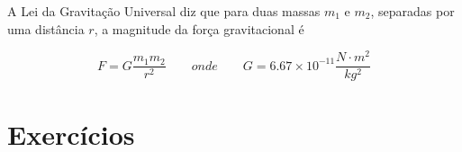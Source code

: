 A Lei da Gravitação Universal diz que para duas massas $m_1$ e $m_2$, separadas por uma distância $r$, a magnitude da força gravitacional é

\begin{equation}
    F=G\frac{m_1m_2}{r^2} \qquad onde \qquad G=6.67\times 10^{-11}\frac{N\cdot m^2}{kg^2}
\end{equation}

\section{Exercícios}
